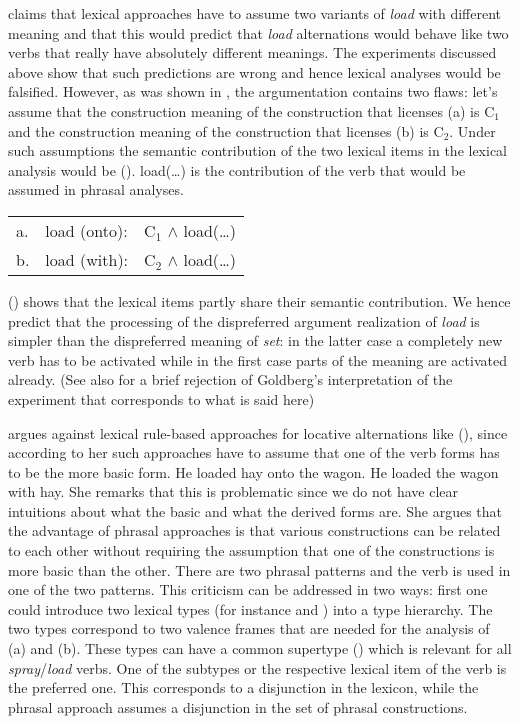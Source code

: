 \begin{exe}
\begin{xlist}[iv.]
\begin{exe}
\begin{xlist}[iv.]
\citet[]{Goldberg95a} claims that lexical approaches have to assume two variants of \emph{load}
with different meaning and that this would predict that \emph{load} alternations would behave like
two verbs that really have absolutely different meanings. The experiments discussed above show that
such predictions are wrong and hence lexical analyses would be falsified. However, as was shown in
, the argumentation contains two flaws: let's assume that the construction
meaning of the construction that licenses (a) is C$_1$ and the construction meaning of the
construction that licenses (b) is C$_2$. Under such assumptions the semantic contribution of
the two lexical items in the lexical analysis would be (). load(\ldots) is the contribution
of the verb that would be assumed in phrasal analyses.
\ea
\begin{tabular}[t]{@{}l@{~}l@{~}l@{}}
a. & load (onto): & C$_1$ $\wedge$ load(\ldots)\\
b. & load (with): & C$_2$ $\wedge$ load(\ldots)\\
\end{tabular}
\z
() shows that the lexical items partly share their semantic contribution. We hence predict
that the processing of the dispreferred argument realization of \emph{load} is simpler than the
dispreferred meaning of \emph{set}: in the latter case a completely new verb has to be activated
while in the first case parts of the meaning are activated already. (See also  for a brief rejection of Goldberg's interpretation of the experiment that
corresponds to what is said here)

\citet[]{Goldberg95a} argues against lexical rule-based approaches for locative
alternations like (), since according to her such approaches have to assume that one of the verb forms has to be the more
basic form.
\eal
\ex He loaded hay onto the wagon.
\ex He loaded the wagon with hay.
\zl
She remarks that this is problematic since we do not have clear intuitions about what the basic and
what the derived forms are. She argues that the advantage of phrasal approaches is that various
constructions can be related to each other without requiring the assumption that one of the
constructions is more basic than the other. There are two phrasal patterns and the verb is used in
one of the two patterns. This criticism can be addressed in two ways: first one could introduce two
lexical types (for instance  and ) into a type hierarchy. The two
types correspond to two valence frames that are needed for the analysis of (a) and
(b). These types can have a common supertype () which is relevant for all
\emph{spray}/\emph{load} verbs. One of the subtypes or the respective lexical item of the verb is
the preferred one. This corresponds to a disjunction in the lexicon, while the phrasal approach
assumes a disjunction in the set of phrasal constructions. 


\end{xlist}
\end{exe}
\end{xlist}
\end{exe}
